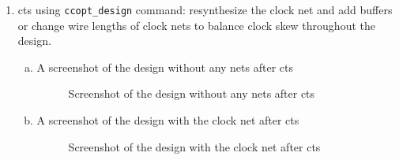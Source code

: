 \documentclass[a4paper,11pt]{article}%
\begin{document}
\begin{enumerate}[1.)]
	\item \ac{cts} using {\tt ccopt\_design} command: resynthesize the clock net and add buffers or change wire lengths of clock nets to balance clock skew throughout the design.
	
	\begin{enumerate}[a.]
		\item A screenshot of the design without any nets after \ac{cts}
		\begin{figure}[H]
			\centering
			\caption{Screenshot of the design without any nets after \ac{cts}}
		\end{figure}
		
		\item A screenshot of the design with the clock net	after \ac{cts}	
		\begin{figure}[H]
			\centering
			\caption{Screenshot of the design with the clock net after \ac{cts}}
		\end{figure}
	\end{enumerate}
	
	
\end{enumerate} 

\pagebreak
{\small


}
\end{document}
